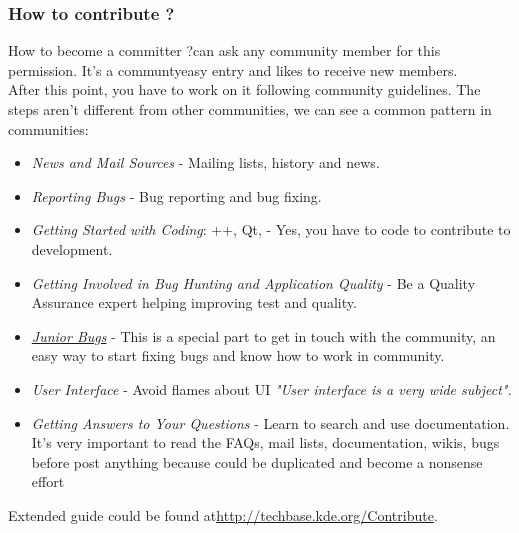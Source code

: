 \subsubsection{How to contribute ?} How to become a committer ?\nolinebreakYou can ask any community member for this permission. It's a communty\nolinebreakwith easy entry and likes to receive new members.
\\ After this point, you have to work on it following community guidelines. The steps aren't different from other communities, we can see a common pattern in communities:
\begin{itemize}
	\item \textit{News and Mail Sources} - Mailing lists, history and news.
	\item \textit{Reporting Bugs} - Bug reporting and bug fixing.
	\item \textit{Getting Started with Coding}: \nolinebreakC++, Qt, \nolinebreakKDE - Yes, you have to code to contribute to development.
	\item \textit{Getting Involved in Bug Hunting and Application Quality} - Be a Quality Assurance expert helping improving test and quality.\nolinebreak
	\item \href{http://community.kde.org/KDE/Junior_Jobs}{\textit{Junior Bugs}} - This is a special part to get in touch with the community, an easy way to start fixing bugs and know how to work in community.
	\item \textit{User Interface} - Avoid flames about UI \textit{"User interface is a very wide subject".}
	\item \textit{Getting Answers to Your Questions} - Learn to search and use documentation. It's very important to read the FAQs, mail lists, documentation, wikis, bugs before post anything because could be duplicated and become a nonsense effort
\end{itemize} Extended guide could be found at\nolinebreak\href{http://techbase.kde.org/Contribute}{http://techbase.kde.org/Contribute}.